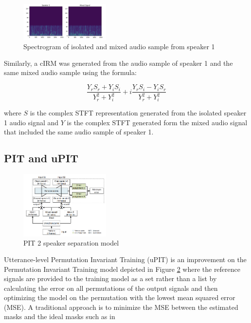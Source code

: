 \documentclass[journal, a4paper]{IEEEtran}
\begin{document}
\begin{figure}[h!]
    \centering  
     \caption{\label{fig:spec_speaker_1}Spectrogram of isolated and mixed audio sample from speaker 1}  
    \includegraphics[width=0.4\textwidth]{cIRM_same.png}  
\end{figure}

Similarly, a cIRM was generated from the audio sample of speaker 1 and the same mixed audio sample using the formula:

\begin{equation}
\dfrac{Y_r S_r + Y_i S_i}{Y_r^2 + Y_i^2} +
i\dfrac{Y_r S_i - Y_i S_r}{Y_r^2 + Y_i^2}
\end{equation}

\begin{flushleft}
where $S$ is the complex STFT representation generated from the isolated speaker 1 audio signal and $Y$ is the complex STFT generated form the mixed audio signal that included the same audio sample of speaker 1.\cite{DBLP:journals/corr/abs-1708-07524}
\end{flushleft}

\subsection{PIT and uPIT}

\begin{figure}[h]
    \centering  
     \caption{\label{fig:pit_diagram}PIT 2 speaker separation model}  
    \includegraphics[width=0.4\textwidth]{PIT.png}  
\end{figure}

Utterance-level Permutation Invariant Training (uPIT) is an improvement on the Permutation Invariant Training model depicted in Figure \ref{fig:pit_diagram} where the reference signals are provided to the training model as a set rather than a list by calculating the error on all permutations of the output signals and then optimizing the model on the permutation with the lowest mean squared error (MSE). A traditional approach is to minimize the MSE between the estimated masks and the ideal masks such as in
\end{document}
